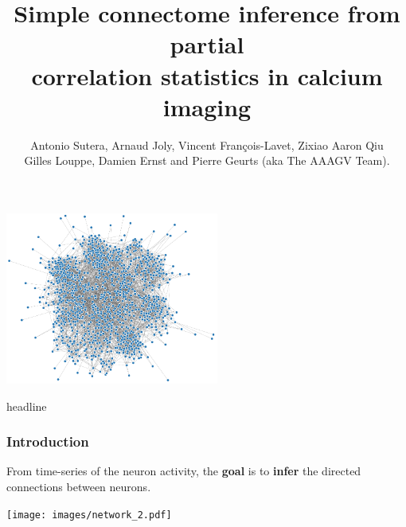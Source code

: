\documentclass[final]{beamer}
\title{Simple connectome inference from partial\\[1ex]
correlation statistics in calcium imaging}
\author{{\small Antonio Sutera, Arnaud Joly, Vincent François-Lavet, Zixiao Aaron Qiu\\[1ex] Gilles Louppe, Damien Ernst and Pierre Geurts (aka The AAAGV Team).}}
\date{}
\begin{document}

\begin{frame}
	

\vspace{-0cm}

	\begin{center}
	\includegraphics[width=7cm]{images/network.png}
	\end{center}

\vspace{-9.5cm}
  \begin{beamercolorbox}[wd=\paperwidth, ignorebg]{headline}
    \begin{center}
      
    \end{center}
  \end{beamercolorbox}

\end{frame}



\begin{frame}

\frametitle{Introduction}

\vspace{2cm}

From {\color{i6blue} time-series of the neuron activity}, the \textbf{goal} is to {\color{red} \textbf{infer} the directed connections between neurons}.\\[5ex]

\begin{center}
\texttt{[image: images/network\_2.pdf]}
\end{center}

\end{frame}
\end{document}
